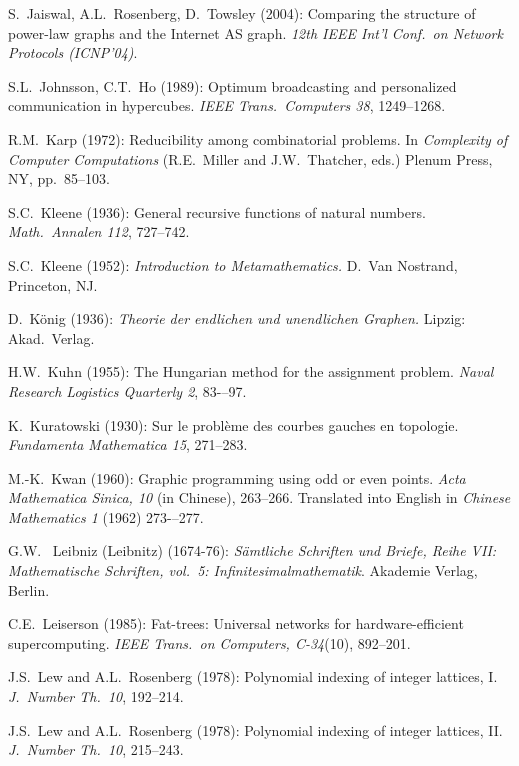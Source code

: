 \begin{thebibliography}{999}



S.~Jaiswal, A.L.~Rosenberg, D.~Towsley (2004):
Comparing the structure of power-law graphs and the Internet AS graph.
{\it 12th IEEE Int'l Conf.~on Network Protocols (ICNP'04)}.

S.L.~Johnsson, C.T.~Ho (1989):
Optimum broadcasting and personalized communication in hypercubes.
{\it IEEE Trans.~Computers 38}, 1249--1268.



R.M.~Karp (1972): Reducibility among combinatorial problems.  In {\it
Complexity of Computer Computations} (R.E.~Miller and J.W.~Thatcher,
eds.)  Plenum Press, NY, pp.~85--103.

S.C.~Kleene (1936): General recursive functions of natural numbers.
{\it Math.~Annalen 112}, 727--742.

S.C.~Kleene (1952):
{\it Introduction to Metamathematics.}
D.~Van Nostrand, Princeton, NJ.

D.~K\"onig (1936):
{\it Theorie der endlichen und unendlichen Graphen.}  Lipzig: Akad.~Verlag.

H.W.~Kuhn (1955): The Hungarian method for the assignment problem.
{\it Naval Research Logistics Quarterly 2}, 83-–97.

K.~Kuratowski (1930):
Sur le probl\`{e}me des courbes gauches en topologie.
{\it Fundamenta Mathematica 15}, 271--283. 

M.-K.~Kwan (1960): Graphic programming using odd or even points.
{\it Acta Mathematica Sinica, 10} (in Chinese), 263--266.  Translated
into English in {\it Chinese Mathematics 1} (1962) 273-–277.



G.W.~ Leibniz (Leibnitz) (1674-76):
{\it S\"{a}mtliche Schriften und Briefe, Reihe VII: Mathematische
  Schriften, vol.~5: Infinitesimalmathematik}.
Akademie Verlag, Berlin.

C.E.~Leiserson (1985):
Fat-trees: Universal networks for hardware-efficient supercomputing.
{\it IEEE Trans.~on Computers, C-34}(10), 892--201.

J.S.~Lew and A.L.~Rosenberg (1978): Polynomial indexing of integer
lattices, I.  {\it J.~Number Th.~10}, 192--214.
 
J.S.~Lew and A.L.~Rosenberg (1978): Polynomial indexing of integer
lattices, II.  {\it J.~Number Th.~10}, 215--243.


\end{thebibliography}
